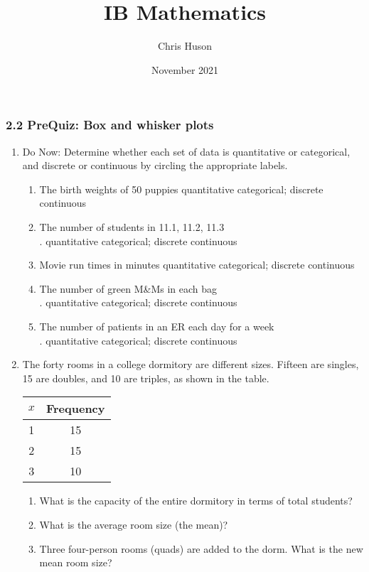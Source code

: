 \documentclass[12pt, twoside]{article}
\title{IB Mathematics}
\author{Chris Huson}
\date{November 2021}
\begin{document}
\subsubsection*{2.2 PreQuiz: Box and whisker plots}
\begin{enumerate}
  \item Do Now: Determine whether each set of data is quantitative or categorical, and discrete or continuous by circling the appropriate labels.
  \begin{enumerate}[itemsep=0.5cm]
    \item The birth weights of 50 puppies \hfill quantitative categorical; discrete continuous
    \item The number of students in 11.1, 11.2, 11.3\\.  \hfill quantitative categorical; discrete continuous
    \item Movie run times in minutes \hfill quantitative categorical; discrete continuous
    \item The number of green M\&Ms in each bag\\. \hfill quantitative categorical; discrete continuous
    \item The number of patients in an ER each day for a week\\. \hfill quantitative categorical; discrete continuous
  \end{enumerate} \vspace{0.5cm}

\item The forty rooms in a college dormitory are different sizes. Fifteen are singles, 15 are doubles, and 10 are triples, as shown in the table.
\begin{center}
  \begin{tabular}{|c|c|}
    \hline
    $x$ & Frequency\\ 
    \hline 
    1 & 15 \\ 
    \hline 
    2 & 15 \\ 
    \hline 
    3 & 10 \\ 
    \hline 
    \end{tabular}
\end{center}

\begin{enumerate}
  \item What is the capacity of the entire dormitory in terms of total students? \vspace{1.5cm}
  \item What is the average room size (the mean)? \vspace{2.5cm}
  \item Three four-person rooms (quads) are added to the dorm. What is the new mean room size?
\end{enumerate}
\vspace{1cm}


\end{enumerate}
\end{document}
